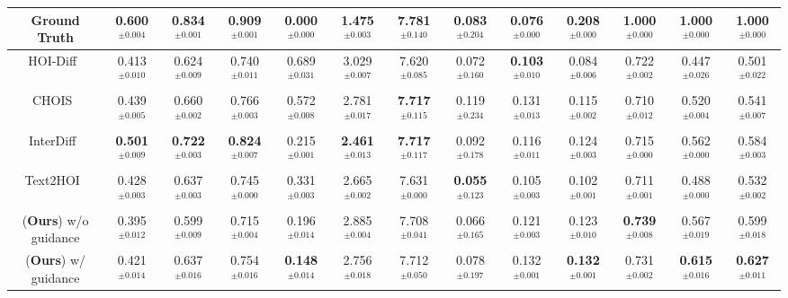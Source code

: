 \begin{table}
{\begin{tabular}{@{}ccccccccccccc@{}}
        Ground Truth &
         0.600$^{\pm0.004}$ & 0.834$^{\pm0.001}$ & 0.909$^{\pm0.001}$ & 0.000$^{\pm0.000}$ & 1.475$^{\pm0.003}$ & 7.781$^{\pm0.140}$ & 0.083$^{\pm0.204}$ & 0.076$^{\pm0.000}$ & 0.208$^{\pm0.000}$ & 1.000$^{\pm0.000}$ & 1.000$^{\pm0.000}$ & 1.000$^{\pm0.000}$ \\
        \midrule
        HOI-Diff~\citep{peng2023hoi} &
        0.413$^{\pm0.010}$ & 0.624$^{\pm0.009}$ & 0.740$^{\pm0.011}$ & 0.689$^{\pm0.031}$ & 3.029$^{\pm0.007}$ & 7.620$^{\pm0.085}$ & 0.072$^{\pm0.160}$ & \textbf{0.103}$^{\pm0.010}$ & 0.084$^{\pm0.006}$ & 0.722$^{\pm0.002}$ & 0.447$^{\pm0.026}$ & 0.501$^{\pm0.022}$ \\
        CHOIS~\citep{li2023controllable} &
        0.439$^{\pm0.005}$ & 0.660$^{\pm0.002}$ & 0.766$^{\pm0.003}$ & 0.572$^{\pm0.008}$ & 2.781$^{\pm0.017}$ & \textbf{7.717}$^{\pm0.115}$ & 0.119$^{\pm0.234}$ & 0.131$^{\pm0.013}$ & 0.115$^{\pm0.002}$ & 0.710$^{\pm0.012}$ & 0.520$^{\pm0.004}$ & 0.541$^{\pm0.007}$ \\
        InterDiff~\citep{xu2023interdiff} &
        \textbf{0.501}$^{\pm0.009}$ & \textbf{0.722}$^{\pm0.003}$ & \textbf{0.824}$^{\pm0.007}$ & 0.215$^{\pm0.001}$ & \textbf{2.461}$^{\pm0.013}$ & \textbf{7.717}$^{\pm0.117}$ & 0.092$^{\pm0.178}$ & 0.116$^{\pm0.011}$ & 0.124$^{\pm0.003}$ & 0.715$^{\pm0.000}$ & 0.562$^{\pm0.000}$ & 0.584$^{\pm0.003}$ \\
        Text2HOI~\citep{cha2024text2hoi} &
        0.428$^{\pm0.003}$ & 0.637$^{\pm0.003}$ & 0.745$^{\pm0.000}$ & 0.331$^{\pm0.003}$ & 2.665$^{\pm0.002}$ & 7.631$^{\pm0.000}$ & \textbf{0.055}$^{\pm0.123}$ & 0.105$^{\pm0.003}$ & 0.102$^{\pm0.001}$ & 0.711$^{\pm0.001}$ & 0.488$^{\pm0.000}$ & 0.532$^{\pm0.002}$ \\
        \ours{} (\textbf{Ours}) w/o guidance &
        0.395$^{\pm0.012}$ & 0.599$^{\pm0.009}$ & 0.715$^{\pm0.004}$ & 0.196$^{\pm0.014}$ & 2.885$^{\pm0.004}$ & 7.708$^{\pm0.041}$ & 0.066$^{\pm0.165}$ & 0.121$^{\pm0.003}$ & 0.123$^{\pm0.010}$ & \textbf{0.739}$^{\pm0.008}$ & 0.567$^{\pm0.019}$ & 0.599$^{\pm0.018}$ \\
        \ours{} (\textbf{Ours}) w/ guidance &
         0.421$^{\pm0.014}$ & 0.637$^{\pm0.016}$ & 0.754$^{\pm0.016}$ & \textbf{0.148}$^{\pm0.014}$ & 2.756$^{\pm0.018}$ & 7.712$^{\pm0.050}$ & 0.078$^{\pm0.197}$ & 0.132$^{\pm0.001}$ & \textbf{0.132}$^{\pm0.001}$ & 0.731$^{\pm0.002}$ & \textbf{0.615}$^{\pm0.016}$ & \textbf{0.627}$^{\pm0.011}$ \\
        \bottomrule
    \end{tabular}}%
\end{table}